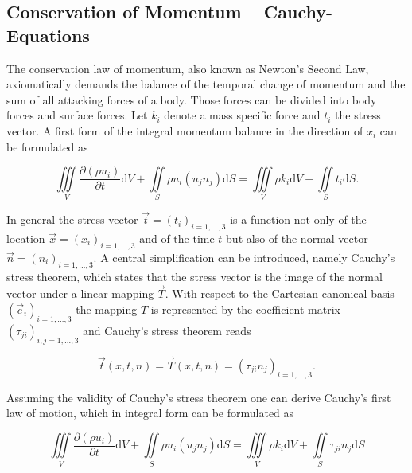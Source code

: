     \subsection{Conservation of Momentum -- Cauchy-Equations}

    The conservation law of momentum, also known as Newton's Second Law, axiomatically demands the balance of the temporal change of momentum and the sum of all attacking forces of a body. Those forces can be divided into body forces and surface forces. Let \(k_i\) denote a mass specific force and \(t_i\) the stress vector. A first form of the integral momentum balance in the direction of \(x_i\) can be formulated as

    \begin{displaymath}
      \iiint\limits_V \frac{\partial \left(\rho u_i \right)}{\partial t} \mathrm{d}V + \iint\limits_S \rho u_i \left( u_j n_j \right) \mathrm{d}S = \iiint\limits_V \rho k_i \mathrm{d}V + \iint\limits_S t_i \mathrm{d}S.
    \end{displaymath}

    In general the stress vector \(\vec{t} = \left( t_i \right)_{i = 1, \dots, 3}\) is a function not only of the location \(\vec{x} = \left( x_i \right)_{i = 1,\dots,3}\) and of the time \(t\) but also of the normal vector \(\vec{n} = \left( n_i \right)_{i = 1,\dots,3} \). A central simplification can be introduced, namely Cauchy's stress theorem, which states that the stress vector is the image of the normal vector under a linear mapping \(\vec{T}\). With respect to the Cartesian canonical basis \(\left(\vec{e}_i \right)_{i = 1, \dots, 3}\) the mapping \(T\) is represented by the coefficient matrix \( \left(\tau_{ji}\right)_{i,j = 1,\dots,3}\) and Cauchy's stress theorem reads

    \begin{displaymath}
      \vec{t}\left(x,t,n\right) = \vec{T}(x,t,n) = \left(\tau_{ji} n_j\right)_{i = 1, \dots, 3}.
    \end{displaymath}

    Assuming the validity of Cauchy's stress theorem one can derive Cauchy's first law of motion, which in integral form can be formulated as

    \begin{equation}
      \label{eq:cauchymotion}
      \iiint\limits_V \frac{\partial \left(\rho u_i \right)}{\partial t} \mathrm{d}V + \iint\limits_S \rho u_i \left( u_j n_j \right) \mathrm{d}S = \iiint\limits_V \rho k_i \mathrm{d}V + \iint\limits_S \tau_{ji}n_j \mathrm{d}S
    \end{equation}

